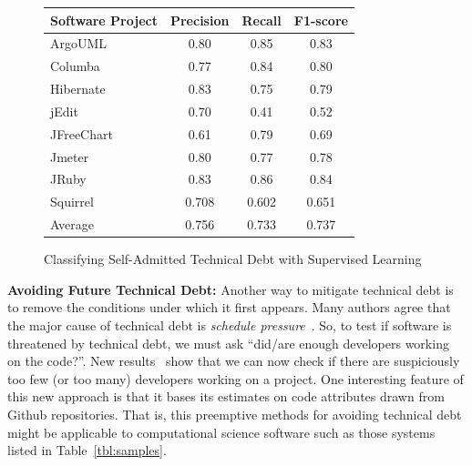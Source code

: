 \documentclass{NSF}
\newcommand{\tbl}[1]{Table~\ref{tbl:#1}}
\begin{document}
\begin{nsfdescription}
\begin{figure}
\small
\begin{center}
\begin{tabular}{l|ccc}
Software Project & Precision & Recall & F1-score \\\hline
ArgoUML          & 0.80     & 0.85  & 0.83    \\
Columba          & 0.77      & 0.84  & 0.80    \\
Hibernate        & 0.83     & 0.75  & 0.79    \\
jEdit            & 0.70     & 0.41   & 0.52    \\
JFreeChart       & 0.61     & 0.79  & 0.69    \\
Jmeter           & 0.80     & 0.77  & 0.78    \\
JRuby            & 0.83     & 0.86  & 0.84    \\
Squirrel         & 0.708     & 0.602  & 0.651    \\
\rowcolor{blue!10}Average          & 0.756     & 0.733  & 0.737    
\end{tabular}
\end{center}
\caption{Classifying Self-Admitted Technical Debt with Supervised Learning~\cite{huang2018identifying}}
\label{tab:SATD}\label{tbl:SATD}
\vspace{-5mm}
\end{figure}

\textbf{Avoiding Future Technical Debt:} Another way to mitigate   technical
debt is to remove the conditions under which it first appears.
Many authors agree that the major cause of technical debt is {\em schedule pressure}~\cite{Ozkaya12}.
So,  to test if  software  is threatened by technical debt,
we must ask  ``did/are enough developers working on the code?''.
New results~\cite{Robles:2014,QiEffort17,xia19} show that we can now check
 if there are 
suspiciously too few (or too many) developers
working on a project.
  One interesting feature of this new approach is that it bases its estimates on code attributes drawn from Github repositories. That is, this
  preemptive methods for avoiding
  technical debt might be applicable to computational science software such as those systems listed in \tbl{samples}.



\end{nsfdescription}
\end{document}
